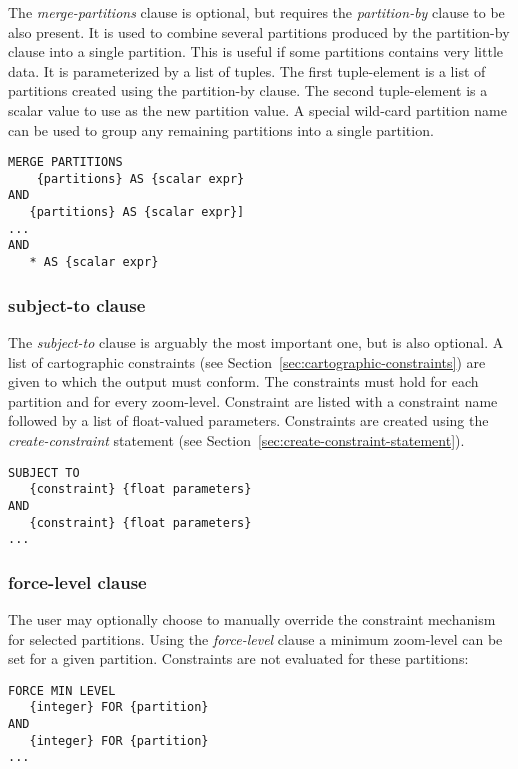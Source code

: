 The \emph{merge-partitions} clause is optional, but requires the \emph{partition-by} clause to be also present. It is used to combine several partitions produced by the partition-by clause into a single partition. This is useful if some partitions contains very little data. It is parameterized by a list of tuples. The first tuple-element is a list of partitions created using the partition-by clause. The second tuple-element is a scalar value to use as the new partition value. A special wild-card partition name can be used to group any remaining partitions into a single partition.

\begin{lstlisting}
MERGE PARTITIONS    
    {partitions} AS {scalar expr}
AND 
   {partitions} AS {scalar expr}]
...
AND 
   * AS {scalar expr}
\end{lstlisting}

\subsubsection{subject-to clause}

The \emph{subject-to} clause is arguably the most important one, but is also optional. A list of cartographic constraints (see Section~\ref{sec:cartographic-constraints}) are given to which the output must conform. The constraints must hold for each partition and for every zoom-level. Constraint are listed with a constraint name followed by a list of float-valued parameters. Constraints are created using the \emph{create-constraint} statement (see Section~\ref{sec:create-constraint-statement}).

\begin{lstlisting}
SUBJECT TO 
   {constraint} {float parameters} 
AND
   {constraint} {float parameters}
...
\end{lstlisting}

\subsubsection{force-level clause}

The user may optionally choose to manually override the constraint mechanism for selected partitions. Using the \emph{force-level} clause a minimum zoom-level can be set for a given partition. Constraints are not evaluated for these partitions:

\begin{lstlisting}
FORCE MIN LEVEL
   {integer} FOR {partition}
AND
   {integer} FOR {partition}
...
\end{lstlisting}


